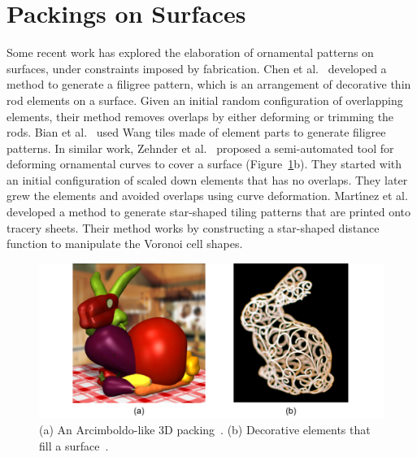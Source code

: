 \section{Packings on Surfaces}



\newtext
{
Some recent work has explored the elaboration of ornamental
patterns on surfaces, under constraints imposed by fabrication.  
Chen et al.~\cite{Chen2016} developed a method to generate a filigree pattern,
which is an arrangement of decorative thin rod elements on a surface.
Given an initial random configuration of overlapping elements, their method
removes overlaps by either deforming or trimming the rods.
Bian et al.~\cite{Bian2018} used Wang tiles made of element parts to generate filigree patterns.
In similar work, Zehnder et al.~\cite{Zehnder2016} 
proposed a semi-automated tool for deforming ornamental curves to cover a surface (Figure~\ref{fig_related_gal_zehnder}b). 
They started with an initial configuration of scaled down elements
that has no overlaps. They later grew the elements and avoided overlaps using curve deformation.
Mart\'{\i}nez et al.~\cite{Martinez2019} developed a method to generate
star-shaped tiling patterns that are printed onto tracery sheets.
Their method works by constructing a star-shaped distance function to manipulate the Voronoi cell shapes. 
}

\begin{figure}[h]
\bigskip
\bigskip
\bigskip
\centering
\includegraphics[width=1.0\textwidth]{figures/related/gal_zehnder.pdf} 
\caption[A 3D packing and a packing on a surface]
{\label{fig_related_gal_zehnder} 
\newtext
{
(a) An Arcimboldo-like 3D packing~\cite{Gal2007B}. 
(b) Decorative elements that fill a surface~\cite{Zehnder2016}.
}
}
\end{figure}

